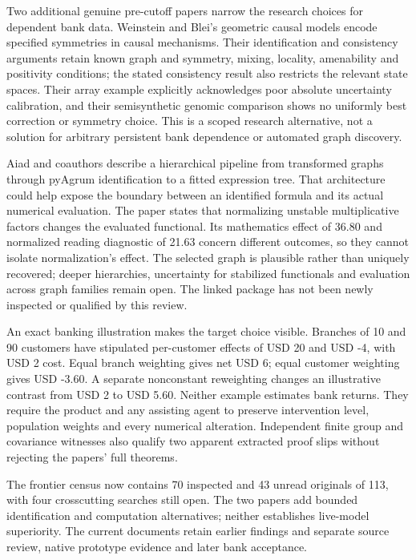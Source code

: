 Two additional genuine pre-cutoff papers narrow the research choices for
dependent bank data. Weinstein and Blei's geometric causal models encode
specified symmetries in causal mechanisms. Their identification and
consistency arguments retain known graph and symmetry, mixing, locality,
amenability and positivity conditions; the stated consistency result
also restricts the relevant state spaces. Their array example explicitly
acknowledges poor absolute uncertainty calibration, and their
semisynthetic genomic comparison shows no uniformly best correction or
symmetry choice. This is a scoped research alternative, not a solution
for arbitrary persistent bank dependence or automated graph discovery.
\citep{exec23_geometric_models}

Aiad and coauthors describe a hierarchical pipeline from transformed
graphs through pyAgrum identification to a fitted expression tree. That
architecture could help expose the boundary between an identified
formula and its actual numerical evaluation. The paper states that
normalizing unstable multiplicative factors changes the evaluated
functional. Its mathematics effect of 36.80 and normalized reading
diagnostic of 21.63 concern different outcomes, so they cannot isolate
normalization's effect. The selected graph is plausible rather than
uniquely recovered; deeper hierarchies, uncertainty for stabilized
functionals and evaluation across graph families remain open. The linked
package has not been newly inspected or qualified by this review.
\citep{exec23_hierarchical_pipeline}

An exact banking illustration makes the target choice visible. Branches
of 10 and 90 customers have stipulated per-customer effects of USD 20
and USD -4, with USD 2 cost. Equal branch weighting gives net USD 6;
equal customer weighting gives USD -3.60. A separate nonconstant
reweighting changes an illustrative contrast from USD 2 to USD 5.60.
Neither example estimates bank returns. They require the product and any
assisting agent to preserve intervention level, population weights and
every numerical alteration. Independent finite group and covariance
witnesses also qualify two apparent extracted proof slips without
rejecting the papers' full theorems. \citep{exec23_structured_reference}

The frontier census now contains 70 inspected and 43 unread originals of
113, with four crosscutting searches still open. The two papers add
bounded identification and computation alternatives; neither establishes
live-model superiority. The current documents retain earlier findings
and separate source review, native prototype evidence and later bank
acceptance. \citep{sp23sc_reader,sp23sc_progress}

